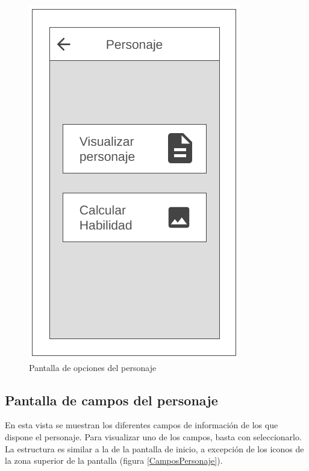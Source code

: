 \begin{figure}[H]
    \centering
    \includegraphics[scale=0.4]{Figures/Mockups/Mock_OpcionesPersonaje.png}
    \caption{Pantalla de opciones del personaje}
    \label{OpcionesPersonaje}    
\end{figure}

\subsection{Pantalla de campos del personaje}
En esta vista se muestran los diferentes campos de información de los que dispone el personaje.
Para visualizar uno de los campos, basta con seleccionarlo. La estructura es similar a la de la 
pantalla de inicio, a excepción de los iconos de la zona superior de la pantalla (figura \ref*{CamposPersonaje}).

